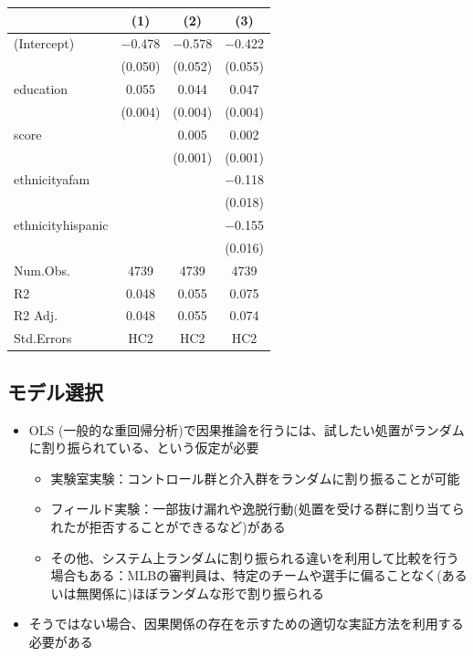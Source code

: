 \documentclass[
]{ltjsarticle}
\providecommand{\tightlist}{%
  \setlength{\itemsep}{0pt}\setlength{\parskip}{0pt}}
\begin{document}
\begin{table}
\centering
\begin{tabular}[t]{lccc}
\toprule
  & (1) & (2) & (3)\\
\midrule
(Intercept) & \num{-0.478} & \num{-0.578} & \num{-0.422}\\
 & (\num{0.050}) & (\num{0.052}) & (\num{0.055})\\
education & \num{0.055} & \num{0.044} & \num{0.047}\\
 & (\num{0.004}) & (\num{0.004}) & (\num{0.004})\\
score &  & \num{0.005} & \num{0.002}\\
 &  & (\num{0.001}) & (\num{0.001})\\
ethnicityafam &  &  & \num{-0.118}\\
 &  &  & (\num{0.018})\\
ethnicityhispanic &  &  & \num{-0.155}\\
 &  &  & (\num{0.016})\\
\midrule
Num.Obs. & \num{4739} & \num{4739} & \num{4739}\\
R2 & \num{0.048} & \num{0.055} & \num{0.075}\\
R2 Adj. & \num{0.048} & \num{0.055} & \num{0.074}\\
Std.Errors & HC2 & HC2 & HC2\\
\bottomrule
\end{tabular}
\end{table}

\hypertarget{ux30e2ux30c7ux30ebux9078ux629e}{%
\subsection{モデル選択}\label{ux30e2ux30c7ux30ebux9078ux629e}}

\begin{itemize}
\tightlist
\item
  OLS
  (一般的な重回帰分析)で因果推論を行うには、試したい処置がランダムに割り振られている、という仮定が必要

  \begin{itemize}
  \tightlist
  \item
    実験室実験：コントロール群と介入群をランダムに割り振ることが可能
  \item
    フィールド実験：一部抜け漏れや逸脱行動(処置を受ける群に割り当てられたが拒否することができるなど)がある
  \item
    その他、システム上ランダムに割り振られる違いを利用して比較を行う場合もある：MLBの審判員は、特定のチームや選手に偏ることなく(あるいは無関係に)ほぼランダムな形で割り振られる
  \end{itemize}
\item
  そうではない場合、因果関係の存在を示すための適切な実証方法を利用する必要がある
\end{itemize}
\end{document}
